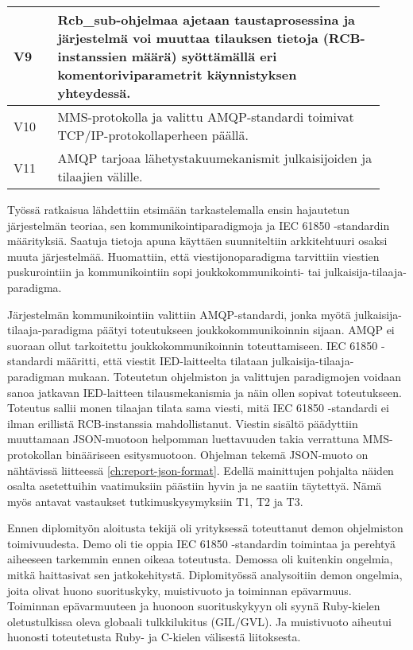 \begin{table}[ht!]
\begin{tabular}{p{0.11\linewidth} | p{0.82\linewidth}}
		V9 & Rcb\_sub-ohjelmaa ajetaan taustaprosessina ja järjestelmä voi muuttaa tilauksen tietoja (RCB-instanssien määrä) syöttämällä eri komentoriviparametrit käynnistyksen yhteydessä. \\
		\hline
		V10 & MMS-protokolla ja valittu AMQP-standardi toimivat TCP/IP-protokollaperheen päällä. \\
		\hline
		V11 & AMQP tarjoaa lähetystakuumekanismit julkaisijoiden ja tilaajien välille. \\
		\hline
	\end{tabular}
\end{table}

Työssä ratkaisua lähdettiin etsimään tarkastelemalla ensin hajautetun järjestelmän teoriaa, sen kommunikointiparadigmoja ja IEC 61850 -standardin määrityksiä. Saatuja tietoja apuna käyttäen suunniteltiin arkkitehtuuri osaksi muuta järjestelmää. Huomattiin, että viestijonoparadigma tarvittiin viestien puskurointiin ja kommunikointiin sopi jouk\-ko\-kom\-mu\-ni\-koin\-ti- tai julkaisija-tilaaja-paradigma.

Järjestelmän kommunikointiin valittiin AMQP-standardi, jonka myötä julkaisija-tilaaja-paradigma päätyi toteutukseen joukkokommunikoinnin sijaan. AMQP ei suoraan ollut tarkoitettu joukkokommunikoinnin toteuttamiseen. IEC 61850 -standardi määritti, että viestit IED-laitteelta tilataan julkaisija-tilaaja-paradigman mukaan. Toteutetun ohjelmiston ja valittujen paradigmojen voidaan sanoa jatkavan IED-laitteen tilausmekanismia ja näin ollen sopivat toteutukseen. Toteutus sallii monen tilaajan tilata sama viesti, mitä IEC 61850 -standardi ei ilman erillistä RCB-instanssia mahdollistanut. Viestin sisältö päädyttiin muuttamaan JSON-muotoon helpomman luettavuuden takia verrattuna MMS-protokollan binääriseen esitysmuotoon. Ohjelman tekemä JSON-muoto on nähtävissä liitteessä \ref{ch:report-json-format}. Edellä mainittujen pohjalta näiden osalta asetettuihin vaatimuksiin päästiin hyvin ja ne saatiin täytettyä. Nämä myös antavat vastaukset tutkimuskysymyksiin T1, T2 ja T3.

Ennen diplomityön aloitusta tekijä oli yrityksessä toteuttanut demon ohjelmiston toimivuudesta. Demo oli tie oppia IEC 61850 -standardin toimintaa ja perehtyä aiheeseen tarkemmin ennen oikeaa toteutusta. Demossa oli kuitenkin ongelmia, mitkä haittasivat sen jatkokehitystä. Diplomityössä analysoitiin demon ongelmia, joita olivat huono suorituskyky, muistivuoto ja toiminnan epävarmuus. Toiminnan epävarmuuteen ja huonoon suorituskykyyn oli syynä Ruby-kielen oletustulkissa oleva globaali tulkkilukitus (GIL/GVL). Ja muistivuoto aiheutui huonosti toteutetusta Ruby- ja C-kielen välisestä liitoksesta.

